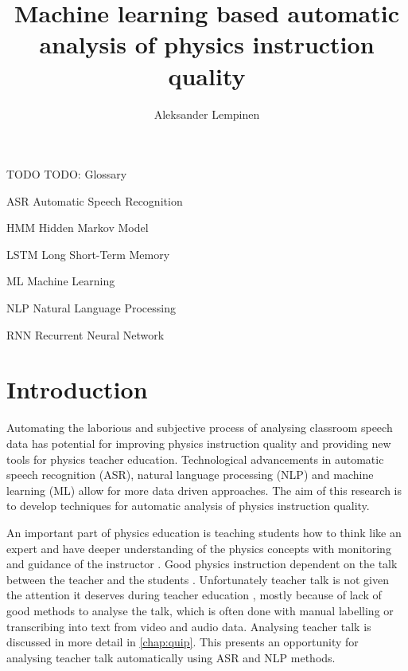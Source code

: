 \documentclass[utf8,english]{gradu3}
\begin{document}
\title{Machine learning based automatic analysis of physics instruction quality}

\author{Aleksander Lempinen}



\maketitle

\begin{thetermlist}
\item[TODO] TODO: Glossary
\item[ASR] Automatic Speech Recognition
\item[HMM] Hidden Markov Model
\item[LSTM] Long Short-Term Memory 
\item[ML] Machine Learning
\item[NLP] Natural Language Processing
\item[RNN] Recurrent Neural Network
\end{thetermlist}

\mainmatter

\chapter{Introduction}
Automating the laborious and subjective process of analysing classroom speech data has potential for improving physics instruction quality and providing new tools for physics teacher education. Technological advancements in automatic speech recognition (ASR), natural language processing (NLP) and machine learning (ML) allow for more data driven approaches. The aim of this research is to develop techniques for automatic analysis of physics instruction quality.

An important part of physics education is teaching students how to think like an expert and have deeper understanding of the physics concepts with monitoring and guidance of the instructor \parencite{wiemanTransformingPhysicsEducation2007}. Good physics instruction dependent on the talk between the teacher and the students \parencite{scottTeachingScienceMeaningful2007}. Unfortunately teacher talk is not given the attention it deserves during teacher education \parencite{crespoPraisingCorrectingProspective2002,lehesvuoriDialogicTeachingScience2013}, mostly because of lack of good methods to analyse the talk, which is often done with manual labelling or transcribing into text from video and audio data. Analysing teacher talk is discussed in more detail in \autoref{chap:quip}. This presents an opportunity for analysing teacher talk automatically using ASR and NLP methods.
\end{document}
